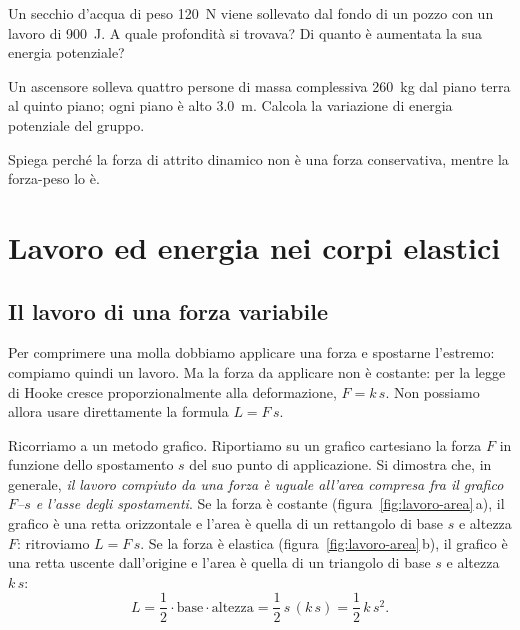 \begin{esercizio}
Un secchio d'acqua di peso \SI{120}{\newton} viene sollevato dal fondo di un pozzo con un lavoro di \SI{900}{\joule}. A quale profondità si trovava? Di quanto è aumentata la sua energia potenziale?\\
\end{esercizio}

\begin{esercizio}
Un ascensore solleva quattro persone di massa complessiva \SI{260}{\kilo\gram} dal piano terra al quinto piano; ogni piano è alto \SI{3,0}{\metre}. Calcola la variazione di energia potenziale del gruppo.\\
\end{esercizio}

\begin{esercizio}
Spiega perché la forza di attrito dinamico non è una forza conservativa, mentre la forza-peso lo è.\\
\end{esercizio}

\section{Lavoro ed energia nei corpi elastici}
\label{sec:corpi-elastici}

\subsection{Il lavoro di una forza variabile}

Per comprimere una molla dobbiamo applicare una forza e spostarne l'estremo: compiamo quindi un lavoro. Ma la forza da applicare non è costante: per la legge di Hooke cresce proporzionalmente alla deformazione, $F = k\,s$. Non possiamo allora usare direttamente la formula $L = F\,s$.

Ricorriamo a un metodo grafico. Riportiamo su un grafico cartesiano la forza $F$ in funzione dello spostamento $s$ del suo punto di applicazione. Si dimostra che, in generale, \emph{il lavoro compiuto da una forza è uguale all'area compresa fra il grafico $F$--$s$ e l'asse degli spostamenti}. Se la forza è costante (figura~\ref{fig:lavoro-area}\,a), il grafico è una retta orizzontale e l'area è quella di un rettangolo di base $s$ e altezza $F$: ritroviamo $L = F\,s$. Se la forza è elastica (figura~\ref{fig:lavoro-area}\,b), il grafico è una retta uscente dall'origine e l'area è quella di un triangolo di base $s$ e altezza $k\,s$:
\[ L = \frac{1}{2} \cdot \text{base} \cdot \text{altezza} = \frac{1}{2}\,s\,(k\,s) = \frac{1}{2}\,k\,s^2. \]

